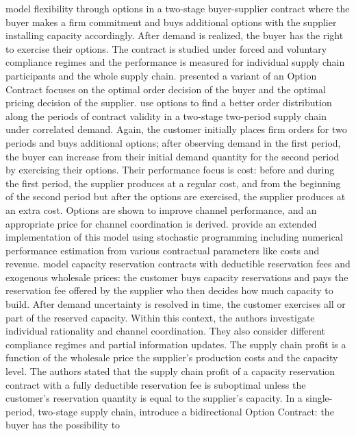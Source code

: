 \documentclass[12pt,english]{article}
\begin{document}
\citet{Cachon:Lariviere2001} model flexibility through options in
a two-stage buyer-supplier contract where the buyer makes a firm commitment
and buys additional options with the supplier installing capacity
accordingly. After demand is realized, the buyer has the right to
exercise their options. The contract is studied under forced and voluntary
compliance regimes and the performance is measured for individual
supply chain participants and the whole supply chain. \citet{Cheng2003}
presented a variant of an Option Contract focuses on the optimal order
decision of the buyer and the optimal pricing decision of the supplier.
\citet{Barnes-Schuster2002b} use options to find a better order distribution
along the periods of contract validity in a two-stage two-period supply
chain under correlated demand. Again, the customer initially places
firm orders for two periods and buys additional options; after observing
demand in the first period, the buyer can increase from their initial
demand quantity for the second period by exercising their options.
Their performance focus is cost: before and during the first period,
the supplier produces at a regular cost, and from the beginning of
the second period but after the options are exercised, the supplier
produces at an extra cost. Options are shown to improve channel performance,
and an appropriate price for channel coordination is derived. \citet{VanDelft2004}
provide an extended implementation of this model using stochastic
programming including numerical performance estimation from various
contractual parameters like costs and revenue. \citet{M.Erkoc2005}
model capacity reservation contracts with deductible reservation fees
and exogenous wholesale prices: the customer buys capacity reservations
and pays the reservation fee offered by the supplier who then decides
how much capacity to build. After demand uncertainty is resolved in
time, the customer exercises all or part of the reserved capacity.
Within this context, the authors investigate individual rationality
and channel coordination. They also consider different compliance
regimes and partial information updates. The supply chain profit is
a function of the wholesale price the supplier\textquoteright s production
costs and the capacity level. The authors stated that the supply chain
profit of a capacity reservation contract with a fully deductible
reservation fee is suboptimal unless the customer\textquoteright s
reservation quantity is equal to the supplier\textquoteright s capacity.
In a single-period, two-stage supply chain, \citet{Wang2006} introduce
a bidirectional Option Contract: the buyer has the possibility to
\end{document}
